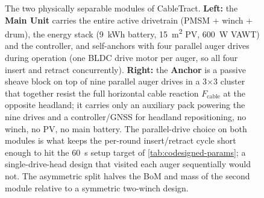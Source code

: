 \documentclass[11pt,a4paper]{article}
\begin{document}
\begin{figure}[H]
{%
}
\caption{The two physically separable modules of CableTract. \textbf{Left:} the \textbf{Main Unit} carries the entire active drivetrain (PMSM + winch + drum), the energy stack (\SI{9}{\kWh} battery, \SI{15}{\meter\squared} PV, \SI{600}{\watt} VAWT) and the controller, and self-anchors with four parallel auger drives during operation (one BLDC drive motor per auger, so all four insert and retract concurrently). \textbf{Right:} the \textbf{Anchor} is a passive sheave block on top of nine parallel auger drives in a 3$\times$3 cluster that together resist the full horizontal cable reaction $F_{\text{cable}}$ at the opposite headland; it carries only an auxiliary pack powering the nine drives and a controller/GNSS for headland repositioning, no winch, no PV, no main battery. The parallel-drive choice on both modules is what keeps the per-round insert/retract cycle short enough to hit the \SI{60}{\second} setup target of \cref{tab:codesigned-params}; a single-drive-head design that visited each auger sequentially would not. The asymmetric split halves the BoM and mass of the second module relative to a symmetric two-winch design.}
\label{fig:f0a}
\end{figure}
\end{document}
